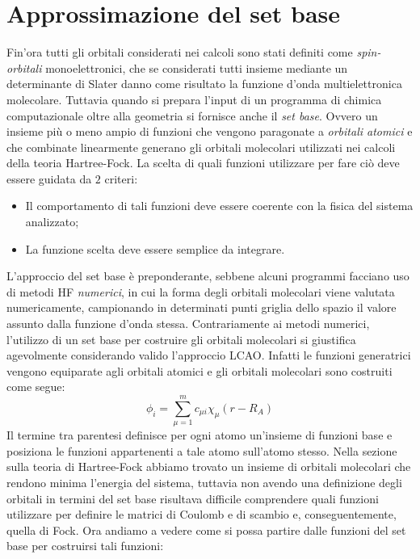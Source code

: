 \documentclass[oneside]{amsbook}
\numberwithin{section}{chapter}
\numberwithin{equation}{section}
\numberwithin{figure}{section}
\begin{document}
\section{Approssimazione del set base}
Fin'ora tutti gli orbitali considerati nei calcoli sono stati definiti come \emph{spin-orbitali}  monoelettronici, che se considerati tutti insieme mediante un determinante di Slater danno come risultato la funzione d'onda multielettronica molecolare. Tuttavia quando si prepara l'input di un programma di chimica computazionale oltre alla geometria si fornisce anche il \emph{set base}. Ovvero un insieme più o meno ampio di funzioni che vengono paragonate a \emph{orbitali atomici} e che combinate linearmente generano gli orbitali molecolari utilizzati nei calcoli della teoria Hartree-Fock. La scelta di quali funzioni utilizzare per fare ciò deve essere guidata da $2$ criteri:
\begin{itemize}
\item Il comportamento di tali funzioni deve essere coerente con la fisica del sistema analizzato;
\item La funzione scelta deve essere semplice da integrare.
\end{itemize}
L'approccio del set base è preponderante, sebbene alcuni programmi facciano uso di metodi HF \emph{numerici}, in cui la forma degli orbitali molecolari viene valutata numericamente, campionando in determinati punti griglia dello spazio il valore assunto dalla funzione d'onda stessa. Contrariamente ai metodi numerici, l'utilizzo di un set base per costruire gli orbitali molecolari si giustifica agevolmente considerando valido l'approccio LCAO. Infatti le funzioni generatrici vengono equiparate agli orbitali atomici e gli orbitali molecolari sono costruiti come segue:
\begin{equation}
\phi_i= \sum \limits_{\mu = 1}^m c_{\mu i }\chi_{\mu} (r-R_A)
\end{equation}
Il termine tra parentesi definisce per ogni atomo un'insieme di funzioni base e posiziona le funzioni appartenenti a tale atomo sull'atomo stesso.
Nella sezione sulla teoria di Hartree-Fock abbiamo trovato un insieme di orbitali molecolari che rendono minima l'energia del sistema, tuttavia non avendo una definizione degli orbitali in termini del set base risultava difficile comprendere quali funzioni utilizzare per definire le matrici di Coulomb e di scambio e, conseguentemente, quella di Fock. Ora andiamo a vedere come si possa partire dalle funzioni del set base per costruirsi tali funzioni:
\end{document}
